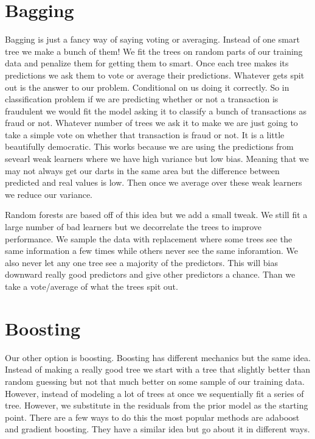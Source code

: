 \documentclass[
  letterpaper,
  DIV=11,
  numbers=noendperiod]{scrreprt}
\begin{document}
\section{Bagging}\label{bagging}

Bagging is just a fancy way of saying voting or averaging. Instead of
one smart tree we make a bunch of them! We fit the trees on random parts
of our training data and penalize them for getting them to smart. Once
each tree makes its predictions we ask them to vote or average their
predictions. Whatever gets spit out is the answer to our problem.
Conditional on us doing it correctly. So in classification problem if we
are predicting whether or not a transaction is fraudulent we would fit
the model asking it to classify a bunch of transactions as fraud or not.
Whatever number of trees we ask it to make we are just going to take a
simple vote on whether that transaction is fraud or not. It is a little
beautifully democratic. This works because we are using the predictions
from sevearl weak learners where we have high variance but low bias.
Meaning that we may not always get our darts in the same area but the
difference between predicted and real values is low. Then once we
average over these weak learners we reduce our variance.

Random forests are based off of this idea but we add a small tweak. We
still fit a large number of bad learners but we decorrelate the trees to
improve performance. We sample the data with replacement where some
trees see the same information a few times while others never see the
same inforamtion. We also never let any one tree see a majority of the
predictors. This will bias downward really good predictors and give
other predictors a chance. Than we take a vote/average of what the trees
spit out.

\section{Boosting}\label{boosting}

Our other option is boosting. Boosting has different mechanics but the
same idea. Instead of making a really good tree we start with a tree
that slightly better than random guessing but not that much better on
some sample of our training data. However, instead of modeling a lot of
trees at once we sequentially fit a series of tree. However, we
substitute in the residuals from the prior model as the starting point.
There are a few ways to do this the most popular methods are adaboost
and gradient boosting. They have a similar idea but go about it in
different ways.
\end{document}
